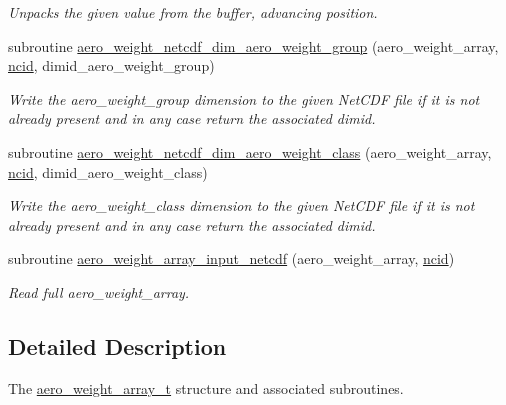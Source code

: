 \begin{DoxyCompactItemize}
\begin{DoxyCompactList}\small\item\em Unpacks the given value from the buffer, advancing position. \end{DoxyCompactList}\item 
subroutine \mbox{\hyperlink{namespacepmc__aero__weight__array_a7b61181ea630c3bf41cf13124c206226}{aero\+\_\+weight\+\_\+netcdf\+\_\+dim\+\_\+aero\+\_\+weight\+\_\+group}} (aero\+\_\+weight\+\_\+array, \mbox{\hyperlink{fractal_8_f90_a4e89f3f850921ff84a6dfce8b166ad50}{ncid}}, dimid\+\_\+aero\+\_\+weight\+\_\+group)
\begin{DoxyCompactList}\small\item\em Write the {\ttfamily aero\+\_\+weight\+\_\+group} dimension to the given Net\+C\+DF file if it is not already present and in any case return the associated dimid. \end{DoxyCompactList}\item 
subroutine \mbox{\hyperlink{namespacepmc__aero__weight__array_a2a35954eccffa6d2706b58fe27dde736}{aero\+\_\+weight\+\_\+netcdf\+\_\+dim\+\_\+aero\+\_\+weight\+\_\+class}} (aero\+\_\+weight\+\_\+array, \mbox{\hyperlink{fractal_8_f90_a4e89f3f850921ff84a6dfce8b166ad50}{ncid}}, dimid\+\_\+aero\+\_\+weight\+\_\+class)
\begin{DoxyCompactList}\small\item\em Write the {\ttfamily aero\+\_\+weight\+\_\+class} dimension to the given Net\+C\+DF file if it is not already present and in any case return the associated dimid. \end{DoxyCompactList}\item 
subroutine \mbox{\hyperlink{namespacepmc__aero__weight__array_a11210bfed165f0953131f08759fca5a0}{aero\+\_\+weight\+\_\+array\+\_\+input\+\_\+netcdf}} (aero\+\_\+weight\+\_\+array, \mbox{\hyperlink{fractal_8_f90_a4e89f3f850921ff84a6dfce8b166ad50}{ncid}})
\begin{DoxyCompactList}\small\item\em Read full aero\+\_\+weight\+\_\+array. \end{DoxyCompactList}\end{DoxyCompactItemize}


\subsection{Detailed Description}
The \mbox{\hyperlink{structpmc__aero__weight__array_1_1aero__weight__array__t}{aero\+\_\+weight\+\_\+array\+\_\+t}} structure and associated subroutines. 

